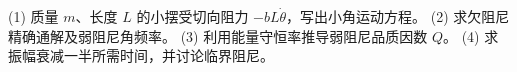 (1) 质量 \(m\)、长度 \(L\) 的小摆受切向阻力 \(-bL\dot\theta\)，写出小角运动方程。
(2) 求欠阻尼精确通解及弱阻尼角频率。
(3) 利用能量守恒率推导弱阻尼品质因数 \(Q\)。
(4) 求振幅衰减一半所需时间，并讨论临界阻尼。
